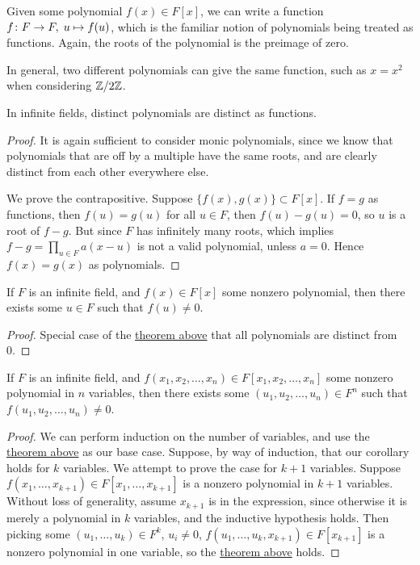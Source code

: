 \begin{definition}
    Given some polynomial \(f(x) \in F[x]\),
    we can write a function \(f\colon F\to F,\;u\mapsto f(u)\),
    which is the familiar notion of polynomials being treated as functions.
    Again, the roots of the polynomial is the preimage of zero.
\end{definition}
\begin{remark}
    In general, two different polynomials can give the same function,
    such as \(x = x^2\) when considering \(\mathbb{Z}/2\mathbb{Z}\).
\end{remark}
\begin{theorem}\label{thm:polynomial-distinct-func}
    In infinite fields, distinct polynomials are distinct as functions.
\end{theorem}
\begin{proof}
    It is again sufficient to consider monic polynomials,
    since we know that polynomials that are off by a multiple
    have the same roots,
    and are clearly distinct from each other everywhere else.

    We prove the contrapositive.
    Suppose \(\{f(x),g(x)\} \subset F[x]\).
    If \(f = g\) as functions, then \(f(u) = g(u)\) for all \(u \in F\),
    then \(f(u) - g(u) = 0\), so \(u\) is a root of \(f - g\).
    But since \(F\) has infinitely many roots,
    which implies \(f - g = \prod_{u \in F} a(x-u)\) is not a valid polynomial,
    unless \(a = 0\).
    Hence \(f(x) = g(x)\) as polynomials.
\end{proof}
\begin{corollary}
    If \(F\) is an infinite field,
    and \(f(x) \in F[x]\) some nonzero polynomial,
    then there exists some \(u \in F\) such that \(f(u) \neq 0\).
\end{corollary}
\begin{proof}
    Special case of the \hyperref[thm:polynomial-distinct-func]{theorem above}
    that all polynomials are distinct from 0.
\end{proof}
\begin{corollary}
    If \(F\) is an infinite field,
    and \(f(x_1,x_2,\hdots,x_n) \in F[x_1,x_2,\hdots,x_n]\)
    some nonzero polynomial in \(n\) variables,
    then there exists some \((u_1,u_2,\hdots,u_n) \in F^n\)
    such that \(f(u_1,u_2,\hdots,u_n) \neq 0\).
\end{corollary}
\begin{proof}
    We can perform induction on the number of variables,
    and use the \hyperref[thm:polynomial-distinct-func]{theorem above}
    as our base case.
    Suppose, by way of induction, that our corollary holds for \(k\) variables.
    We attempt to prove the case for \(k+1\) variables.
    Suppose \(f(x_1,\hdots,x_{k+1}) \in F[x_1,\hdots,x_{k+1}]\)
    is a nonzero polynomial in \(k+1\) variables.
    Without loss of generality, assume \(x_{k+1}\) is in the expression,
    since otherwise it is merely a polynomial in \(k\) variables,
    and the inductive hypothesis holds.
    Then picking some \((u_1,\hdots,u_k) \in F^k\), \(u_i \neq 0\),
    \(f(u_1,\hdots,u_k,x_{k+1}) \in F[x_{k+1}]\)
    is a nonzero polynomial in one variable,
    so the \hyperref[thm:polynomial-distinct-func]{theorem above} holds.
\end{proof}
